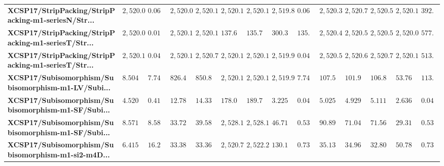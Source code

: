 \begin{tabular}{llllllllllllll}
\textbf{XCSP17/StripPacking/StripPacking-m1-seriesN/Str...} &        $2,520.06$ &   $0.060483$ &    $2,520.06$ &      $2,520.18$ &                                 $2,520.18$ &                              $2,520.13$ &          $2,519.83$ &  $0.060483$ &              $2,520.36$ &              $2,520.76$ &               $2,520.5$ &              $2,520.11$ &   $392.784$ \\
\textbf{XCSP17/StripPacking/StripPacking-m1-seriesT/Str...} &        $2,520.04$ &   $0.015098$ &    $2,520.13$ &      $2,520.12$ &                                  $137.622$ &                               $135.708$ &           $300.309$ &   $135.708$ &              $2,520.44$ &              $2,520.58$ &              $2,520.58$ &              $2,520.06$ &   $577.384$ \\
\textbf{XCSP17/StripPacking/StripPacking-m1-seriesT/Str...} &        $2,520.11$ &   $0.047376$ &    $2,520.12$ &       $2,520.7$ &                                 $2,520.16$ &                              $2,520.11$ &          $2,519.96$ &  $0.047376$ &              $2,520.53$ &              $2,520.69$ &              $2,520.77$ &               $2,520.1$ &   $513.819$ \\
\textbf{XCSP17/Subisomorphism/Subisomorphism-m1-LV/Subi...} &         $8.50445$ &    $7.74157$ &     $826.497$ &       $850.852$ &                                  $2,520.1$ &                               $2,520.1$ &          $2,519.98$ &   $7.74157$ &               $107.576$ &               $101.991$ &               $106.867$ &               $53.7696$ &   $113.901$ \\
\textbf{XCSP17/Subisomorphism/Subisomorphism-m1-SF/Subi...} &         $4.52028$ &   $0.419156$ &     $12.7818$ &       $14.3318$ &                                  $178.047$ &                               $189.745$ &           $3.22553$ &  $0.042456$ &               $5.02594$ &               $4.92978$ &               $5.11146$ &                $2.6363$ &  $0.042456$ \\
\textbf{XCSP17/Subisomorphism/Subisomorphism-m1-SF/Subi...} &         $8.57101$ &    $8.58108$ &     $33.7274$ &        $39.585$ &                                  $2,528.1$ &                              $2,528.11$ &           $46.7153$ &  $0.537579$ &               $90.8967$ &               $71.0481$ &               $71.5633$ &                 $29.31$ &  $0.537579$ \\
\textbf{XCSP17/Subisomorphism/Subisomorphism-m1-si2-m4D...} &         $6.41547$ &    $16.2642$ &     $33.3873$ &       $33.3666$ &                                 $2,520.75$ &                              $2,522.28$ &           $130.105$ &  $0.737295$ &               $35.1353$ &               $34.9682$ &               $32.8073$ &               $50.7846$ &  $0.737295$ \\

\end{tabular}
